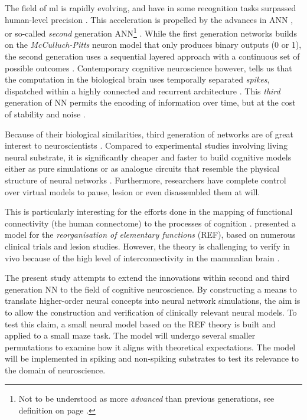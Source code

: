 \documentclass[report.tex]{subfiles}
\begin{document}
The field of \gls{ml} is rapidly evolving, and have in
some recognition tasks surpassed human-level precision
\autocite{Schmidhuber2014}.
This acceleration is propelled by the advances in \gls{ANN}
\autocite{Rumelhart1988, Schmidhuber2014, Nilsson2009}, or
so-called \textit{second} generation \gls{ANN}\footnote{Not to be 
understood as more \textit{advanced} than previous generations, see definition on page
\pageref{sec:glossary}.} \cite{Maass1997}.
While the first generation networks builds on the \textit{McCulluch-Pitts}
neuron model that only produces binary outputs (0 or 1), the second
generation uses a sequential layered approach with a continuous set of 
possible outcomes \cite{Maass1997, Russel2007}.
Contemporary cognitive neuroscience however, tells us that the computation
in the biological brain uses temporally separated \textit{spikes}, 
dispatched within a highly connected and recurrent architecture 
\cite{Dayan2001, Eliasmith2004}.
This \textit{third} generation of \gls{NN} permits the encoding
of information over time, but at the cost of stability and 
noise \autocite{Maass1997}.

Because of their biological similarities, third generation of
networks are of great interest to neuroscientists
\autocite{Dayan2001,Bruderle2011,Eliasmith2015}.
Compared to experimental studies involving living neural substrate,
it is significantly cheaper and faster to build  cognitive
models either as pure simulations
\autocite{Davison2009, Eliasmith2015} or as analogue circuits
that resemble the physical structure of neural networks
\autocite{Walter2015, Schmitt2017}.
Furthermore, researchers have complete control over virtual models
to pause, lesion or even disassembled them at will.

This is particularly interesting for the efforts done in the
mapping of functional connectivity (the human connectome) to the
processes of cognition \autocite{Eliasmith2015, Mogensen2011}. 
\textcite{Mogensen2011} presented a model for the 
\textit{reorganisation of elementary functions} (REF), based on
numerous clinical trials and lesion studies.
However, the theory is challenging to verify in vivo because of
the high level of interconnectivity in the mammalian brain
\autocite{Hohwy2009, Mogensen2017}.

The present study attempts to extend the innovations within
second and third generation \gls{NN} to the field of cognitive 
neuroscience. 
By constructing a means to translate higher-order neural
concepts into neural network simulations, the aim is to allow
the construction and verification of clinically relevant neural models.
To test this claim, a small neural model based on the
\gls{REF} theory is built and applied to a small maze task.
The model will undergo several smaller permutations to examine
how it aligns with theoretical expectations.
The model will be implemented in spiking and non-spiking
substrates to test its relevance to the domain of neuroscience.
\end{document}

